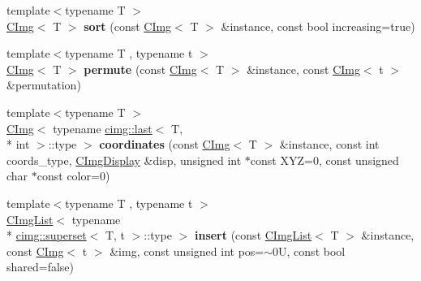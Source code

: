 \begin{DoxyCompactItemize}
\item 
\hypertarget{namespacecimg__library_a2527ebb85bf55e53a11850af1e3ab0b6}{{\footnotesize template$<$typename T $>$ }\\\hyperlink{structcimg__library_1_1_c_img}{C\-Img}$<$ T $>$ {\bfseries sort} (const \hyperlink{structcimg__library_1_1_c_img}{C\-Img}$<$ T $>$ \&instance, const bool increasing=true)}\label{namespacecimg__library_a2527ebb85bf55e53a11850af1e3ab0b6}

\item 
\hypertarget{namespacecimg__library_a2c5378a221a1b91df7ccd7bec4ea5b99}{{\footnotesize template$<$typename T , typename t $>$ }\\\hyperlink{structcimg__library_1_1_c_img}{C\-Img}$<$ T $>$ {\bfseries permute} (const \hyperlink{structcimg__library_1_1_c_img}{C\-Img}$<$ T $>$ \&instance, const \hyperlink{structcimg__library_1_1_c_img}{C\-Img}$<$ t $>$ \&permutation)}\label{namespacecimg__library_a2c5378a221a1b91df7ccd7bec4ea5b99}

\item 
\hypertarget{namespacecimg__library_ab47896ffed965f8982b6af44f90c8b13}{{\footnotesize template$<$typename T $>$ }\\\hyperlink{structcimg__library_1_1_c_img}{C\-Img}$<$ typename \hyperlink{structcimg__library_1_1cimg_1_1last}{cimg\-::last}$<$ T, \\*
int $>$\-::type $>$ {\bfseries coordinates} (const \hyperlink{structcimg__library_1_1_c_img}{C\-Img}$<$ T $>$ \&instance, const int coords\-\_\-type, \hyperlink{structcimg__library_1_1_c_img_display}{C\-Img\-Display} \&disp, unsigned int $\ast$const X\-Y\-Z=0, const unsigned char $\ast$const color=0)}\label{namespacecimg__library_ab47896ffed965f8982b6af44f90c8b13}

\item 
\hypertarget{namespacecimg__library_a422fd36132c697a15cc19e7695486799}{{\footnotesize template$<$typename T , typename t $>$ }\\\hyperlink{structcimg__library_1_1_c_img_list}{C\-Img\-List}$<$ typename \\*
\hyperlink{structcimg__library_1_1cimg_1_1superset}{cimg\-::superset}$<$ T, t $>$\-::type $>$ {\bfseries insert} (const \hyperlink{structcimg__library_1_1_c_img_list}{C\-Img\-List}$<$ T $>$ \&instance, const \hyperlink{structcimg__library_1_1_c_img}{C\-Img}$<$ t $>$ \&img, const unsigned int pos=$\sim$0\-U, const bool shared=false)}\label{namespacecimg__library_a422fd36132c697a15cc19e7695486799}


\end{DoxyCompactItemize}
